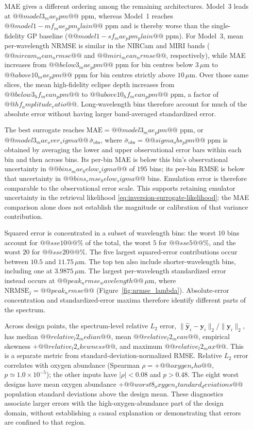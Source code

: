 MAE gives a different ordering among the remaining architectures. Model~3
leads at $@@model3_mae_ppm@@$ ppm, whereas Model~1 reaches
$@@model1-mf_mae_ppm_plain@@$ ppm and is thereby worse than the
single-fidelity GP baseline ($@@model1-sf_mae_ppm_plain@@$ ppm).
For Model~3, mean per-wavelength NRMSE is similar in the NIRCam and MIRI bands
($@@nircam_mean_nrmse@@$ and $@@miri_mean_nrmse@@$, respectively), while MAE
increases from $@@below3_mae_ppm@@$ ppm for bin centres below $3\,\mu$m to
$@@above10_mae_ppm@@$ ppm for bin centres strictly above $10\,\mu$m.
Over those same slices, the mean high-fidelity eclipse depth increases from
$@@below3_hf_mean_ppm@@$ to $@@above10_hf_mean_ppm@@$ ppm, a factor of
$@@hf_amplitude_ratio@@$. Long-wavelength bins therefore account for much of
the absolute error without having larger band-averaged standardized error.

The best surrogate reaches $\mathrm{MAE}=@@model3_mae_ppm@@$ ppm, or
$@@model3_mae_over_sigma@@\,\bar\sigma_{\mathrm{obs}}$, where
$\bar\sigma_{\mathrm{obs}}=@@sigma_obs_ppm@@$ ppm is obtained by averaging
the lower and upper observational error bars within each bin and then across
bins. Its per-bin MAE is below this bin's observational uncertainty in
$@@bins_mae_below_sigma@@$ of $195$ bins; its per-bin RMSE is below that
uncertainty in $@@bins_rmse_below_sigma@@$ bins. Emulation error is therefore
comparable to the observational error scale. This supports retaining emulator
uncertainty in the retrieval likelihood
\eqref{eq:inversion-surrogate-likelihood}; the MAE comparison alone does not
establish the magnitude or calibration of that variance contribution.

Squared error is concentrated in a subset of wavelength bins: the worst
$10$ bins account for $@@sse10@@\%$ of the total, the worst $5$ for
$@@sse5@@\%$, and the worst $20$ for $@@sse20@@\%$.
The five largest squared-error contributions occur between
$10.5$ and $11.75\,\mu$m. The top ten also include shorter-wavelength bins,
including one at $3.9875\,\mu$m. The largest per-wavelength standardized
error instead occurs at $@@peak_nrmse_wavelength@@\,\mu$m, where
$\mathrm{NRMSE}_j=@@peak_nrmse@@$
(Figure~\ref{fig:nrmse_lambda}). Absolute-error concentration and
standardized-error maxima therefore identify different parts of the spectrum.

Across design points, the spectrum-level relative $L_2$ error,
$\|\widehat{\bm y}_i-\bm y_i\|_2/\|\bm y_i\|_2$, has median
$@@relative_l2_median@@$, mean $@@relative_l2_mean@@$, empirical skewness
$+@@relative_l2_skewness@@$, and maximum $@@relative_l2_max@@$. This is a
separate metric from standard-deviation-normalized RMSE.
Relative $L_2$ error correlates with oxygen abundance (Spearman
$\rho=+@@oxygen_rho@@$, $p\simeq 1.0\times10^{-5}$); the other inputs have
$|\rho|<0.08$ and $p>0.48$. The eight worst designs have mean oxygen
abundance $+@@worst8_oxygen_standard_deviations@@$ population standard
deviations above the design mean. These diagnostics associate larger errors
with the high-oxygen-abundance part of the design domain, without establishing
a causal explanation or demonstrating that errors are confined to that region.

